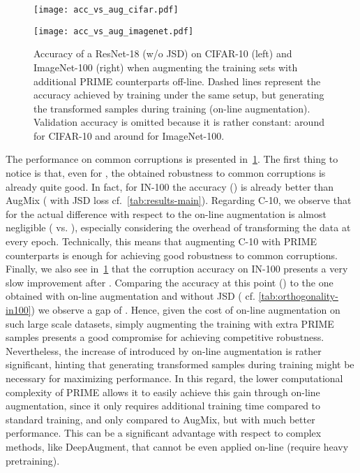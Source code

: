 \documentclass[runningheads]{llncs}
\begin{document}
\begin{figure}[t]
\centering
    \begin{minipage}[c]{0.37\columnwidth}
    \centering
    \texttt{[image: acc\_vs\_aug\_cifar.pdf]}
    \label{fig:acc_vs_aug_cifar} 
\end{minipage}
    \begin{minipage}[c]{0.355\columnwidth}
    \centering
    \texttt{[image: acc\_vs\_aug\_imagenet.pdf]}
    \label{fig:acc_vs_aug_imagenet} 
\end{minipage}\hfill
    \caption{Accuracy of a ResNet-18 (w/o JSD) on CIFAR-10 (left) and ImageNet-100 (right) when augmenting the training sets with additional PRIME counterparts off-line. Dashed lines represent the accuracy achieved by training under the same setup, but generating the transformed samples during training (on-line augmentation). Validation accuracy is omitted because it is rather constant: around  for CIFAR-10 and around  for ImageNet-100.}
    \vspace*{-2mm}
    \label{fig:acc_vs_aug}
\end{figure}

The performance on common corruptions is presented in~\cref{fig:acc_vs_aug}. The first thing to notice is that, even for , the obtained robustness to common corruptions is already quite good. In fact, for IN-100 the accuracy () is already better than AugMix ( with JSD loss cf.~\cref{tab:results-main}). Regarding C-10, we observe that for  the actual difference with respect to the on-line augmentation is almost negligible ( vs. ), especially considering the overhead of transforming the data at every epoch. Technically, this means that augmenting C-10 with  PRIME counterparts is enough for achieving good robustness to common corruptions. 
Finally, we also see in~\cref{fig:acc_vs_aug} that the corruption accuracy on IN-100 presents a very slow improvement after . Comparing the accuracy at this point () to the one obtained with on-line augmentation and without JSD ( cf. \cref{tab:orthogonality-in100}) we observe a gap of . Hence, given the cost of on-line augmentation on such large scale datasets, simply augmenting the training with  extra PRIME samples presents a good compromise for achieving competitive robustness. Nevertheless, the increase of  introduced by on-line augmentation is rather significant, hinting that generating transformed samples during training might be necessary for maximizing performance. In this regard, the lower computational complexity of PRIME allows it to easily achieve this  gain through on-line augmentation, since it only requires  additional training time compared to standard training, and only  compared to AugMix, but with much better performance. This can be a significant advantage with respect to complex methods, like DeepAugment, that cannot be even applied on-line (require heavy pretraining).
\end{document}

